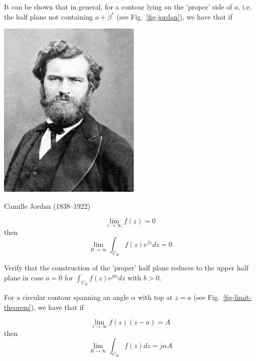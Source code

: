 It can be shown that in general, for a contour lying on the 'proper' side of $a$, i.e. the half plane not containing $a+\beta^*$ (see Fig.~\ref{fig-jordan}), we have that if

\begin{marginfigure}[-2.5cm]
  \includegraphics{complex/figures/camille_jordan}
  \caption{Camille Jordan (1838–1922) }
\end{marginfigure}

\begin{equation}
\lim_{z \to \infty} f(z) = 0
\end{equation}
then
\begin{equation}
\lim_{R \to \infty} \int_{{C}_R} f(z) e^{\beta z} dz = 0
\end{equation}

\begin{cue}
Verify that the construction of the 'proper' half plane reduces to the upper half plane in case $a=0$ for $ \int_{{C}_R} f(z) e^{jb z} dz$ with $b>0$.
\end{cue}


For a circular contour spanning an angle $\alpha$ with top at $z=a$ (see Fig.~\ref{fig-limit-theorem}), we have that if

\begin{equation}
\lim_{z \to \infty}  f(z) (z-a) = A
\end{equation}
then
\begin{equation}
\lim_{R \to \infty} \int_{{C}_R} f(z) dz = j \alpha A
\end{equation}

